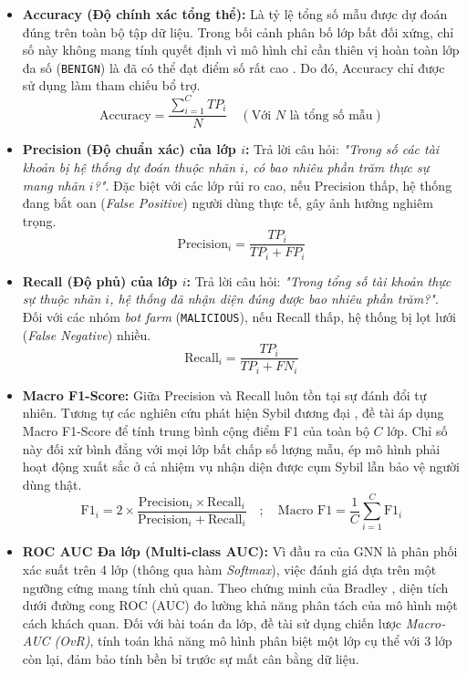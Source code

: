 \begin{itemize}[label={--}, itemsep=1pt]
    \item \textbf{Accuracy (Độ chính xác tổng thể):} Là tỷ lệ tổng số mẫu được dự đoán đúng trên toàn bộ tập dữ liệu. Trong bối cảnh phân bố lớp bất đối xứng, chỉ số này không mang tính quyết định vì mô hình chỉ cần thiên vị hoàn toàn lớp đa số (\texttt{BENIGN}) là đã có thể đạt điểm số rất cao \cite{sokolova2009systematic}. Do đó, Accuracy chỉ được sử dụng làm tham chiếu bổ trợ.
    \[
        \text{Accuracy} = \frac{\sum_{i=1}^{C} TP_i}{N} \quad (\text{Với } N \text{ là tổng số mẫu})
    \]

    \item \textbf{Precision (Độ chuẩn xác) của lớp $i$:} Trả lời câu hỏi: \textit{"Trong số các tài khoản bị hệ thống dự đoán thuộc nhãn $i$, có bao nhiêu phần trăm thực sự mang nhãn $i$?"}. Đặc biệt với các lớp rủi ro cao, nếu Precision thấp, hệ thống đang bắt oan (\textit{False Positive}) người dùng thực tế, gây ảnh hưởng nghiêm trọng.
    \[
        \text{Precision}_i = \frac{TP_i}{TP_i + FP_i}
    \]

    \item \textbf{Recall (Độ phủ) của lớp $i$:} Trả lời câu hỏi: \textit{"Trong tổng số tài khoản thực sự thuộc nhãn $i$, hệ thống đã nhận diện đúng được bao nhiêu phần trăm?"}. Đối với các nhóm \textit{bot farm} (\texttt{MALICIOUS}), nếu Recall thấp, hệ thống bị lọt lưới (\textit{False Negative}) nhiều.
    \[
        \text{Recall}_i = \frac{TP_i}{TP_i + FN_i}
    \]

    \item \textbf{Macro F1-Score:} Giữa Precision và Recall luôn tồn tại sự đánh đổi tự nhiên. Tương tự các nghiên cứu phát hiện Sybil đương đại \cite{liu2025detecting, heeb2024sybil}, đề tài áp dụng Macro F1-Score để tính trung bình cộng điểm F1 của toàn bộ $C$ lớp. Chỉ số này đối xử bình đẳng với mọi lớp bất chấp số lượng mẫu, ép mô hình phải hoạt động xuất sắc ở cả nhiệm vụ nhận diện được cụm Sybil lẫn bảo vệ người dùng thật.
    \[
        \text{F1}_i = 2 \times \frac{\text{Precision}_i \times \text{Recall}_i}{\text{Precision}_i + \text{Recall}_i} \quad ; \quad \text{Macro F1} = \frac{1}{C} \sum_{i=1}^{C} \text{F1}_i
    \]

    \item \textbf{ROC AUC Đa lớp (Multi-class AUC):} Vì đầu ra của GNN là phân phối xác suất trên 4 lớp (thông qua hàm \textit{Softmax}), việc đánh giá dựa trên một ngưỡng cứng mang tính chủ quan. Theo chứng minh của Bradley \cite{bradley1997use}, diện tích dưới đường cong ROC (AUC) đo lường khả năng phân tách của mô hình một cách khách quan. Đối với bài toán đa lớp, đề tài sử dụng chiến lược \textit{Macro-AUC (OvR)}, tính toán khả năng mô hình phân biệt một lớp cụ thể với 3 lớp còn lại, đảm bảo tính bền bỉ trước sự mất cân bằng dữ liệu.
\end{itemize}